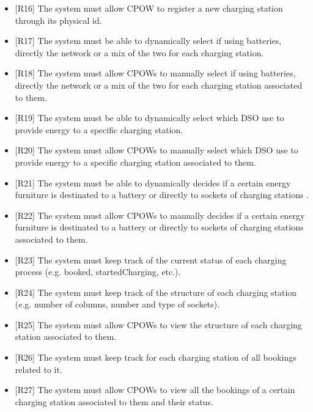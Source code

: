 \documentclass[a4paper]{report}
\begin{document}
\begin{itemize}
    \item{[R16]} \label{R16} The system must allow CPOW to register a new charging station through its physical id.
    \item{[R17]} \label{R17} The system must be able to dynamically select if using batteries, directly the network or a mix of the two for each charging station. 
    \item{[R18]} \label{R18} The system must allow CPOWs to manually select if using batteries, directly the network or a mix of the two for each charging station associated to them. 
    \item{[R19]} \label{R19} The system must be able to dynamically select which DSO use to provide energy to a specific charging station.
    \item{[R20]} \label{R20} The system must allow CPOWs to manually select which DSO use to provide energy to a specific charging station associated to them.
    \item{[R21]} \label{R21} The system must be able to dynamically decides if a certain energy furniture is destinated to a battery or directly to sockets of charging stations .
    \item{[R22]} \label{R22} The system must allow CPOWs to manually decides if a certain energy furniture is destinated to a battery or directly to sockets of charging stations associated to them.
    \item{[R23]} \label{R23} The system must keep track of the current status of each charging process (e.g. booked, startedCharging, etc.).
    \item{[R24]} \label{R24} The system must keep track of the structure of each charging station (e.g. number of columns, number and type of sockets).
    \item{[R25]} \label{R25} The system must allow CPOWs to view the structure of each charging station associated to them.
    \item{[R26]} \label{R26} The system must keep track for each charging station of all bookings related to it.
    \item{[R27]} \label{R27} The system must allow CPOWs to view all the bookings of a certain charging station associated to them and their status.
\end{itemize}
\end{document}
